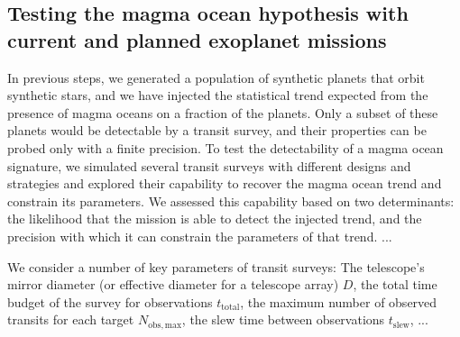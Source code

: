 \documentclass[modern]{aastex631}
\begin{document}
\subsection{Testing the magma ocean hypothesis with current and planned exoplanet missions}
\begin{note}
    In previous steps, we generated a population of synthetic planets that orbit synthetic stars, and we have injected the statistical trend expected from the presence of magma oceans on a fraction of the planets.
    Only a subset of these planets would be detectable by a transit survey, and their properties can be probed only with a finite precision.
    To test the detectability of a magma ocean signature, we simulated several transit surveys with different designs and strategies and explored their capability to recover the magma ocean trend and constrain its parameters.
    We assessed this capability based on two determinants: the likelihood that the mission is able to detect the injected trend, and the precision with which it can constrain the parameters of that trend.
    ...

    We consider a number of key parameters of transit surveys: The telescope's mirror diameter (or effective diameter for a telescope array) $D$, the total time budget of the survey for observations $t_\mathrm{total}$, the maximum number of observed transits for each target $N_\mathrm{obs, max}$, the slew time between observations $t_\mathrm{slew}$, ... 

\end{note}
\end{document}
